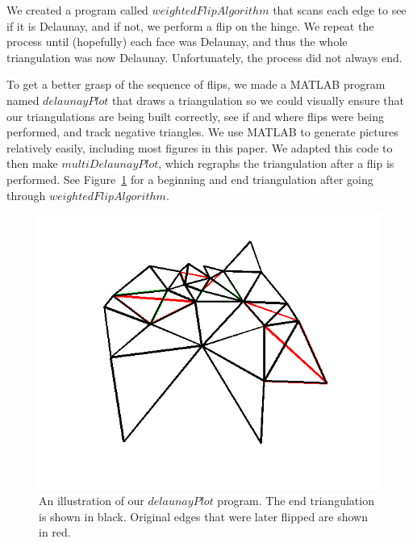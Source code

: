\documentclass[12pt]{article}
\begin{document}
 We created a program called $weightedFlipAlgorithm$ that scans each edge to see if it is Delaunay, and if not, we perform a flip on the hinge. We repeat the process until (hopefully) each face was Delaunay, and thus the whole triangulation was now Delaunay. Unfortunately, the process did not always end. 

 To get a better grasp of the sequence of flips, we made a MATLAB program named $delaunayPlot$ that draws a triangulation so we could visually ensure that our triangulations are being built correctly, see if and where flips were being performed, and track negative triangles. We use MATLAB to generate pictures relatively easily, including most figures in this paper. We adapted this code to then make $multiDelaunayPlot$, which regraphs the triangulation after a flip is performed. See Figure~\ref{genTri5} for a beginning and end triangulation after going through $weightedFlipAlgorithm$. 

\begin{figure}
\centering
\includegraphics[scale = 0.7]{Pictures3/genTri5v2.png}
\caption{An illustration of our $delaunayPlot$ program. The end triangulation is shown in black. Original edges that were later flipped are shown in red.}
\label{genTri5}
\end{figure}
\end{document}

